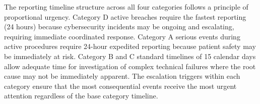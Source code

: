 \begin{table}[H]
\begin{tabularx}{\textwidth}{l X}
\bottomrule
\end{tabularx}
\end{table}

The reporting timeline structure across all four categories follows a principle
of proportional urgency. Category D active breaches require the fastest
reporting (24 hours) because cybersecurity incidents may be ongoing and
escalating, requiring immediate coordinated response. Category A serious events
during active procedures require 24-hour expedited reporting because patient
safety may be immediately at risk. Category B and C standard timelines of 15
calendar days allow adequate time for investigation of complex technical
failures where the root cause may not be immediately apparent. The escalation
triggers within each category ensure that the most consequential events receive
the most urgent attention regardless of the base category timeline.

